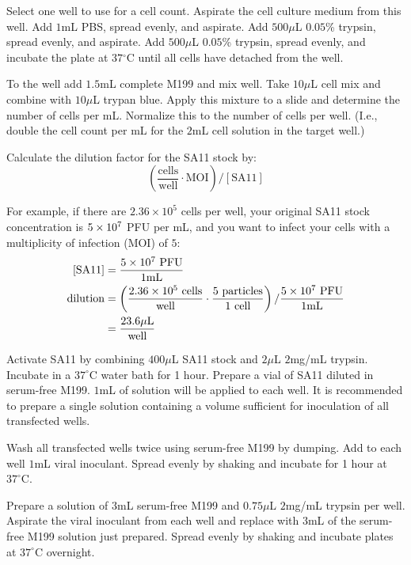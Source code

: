 Select one well to use for a cell count. Aspirate the cell culture medium from this well. Add $1$mL PBS, spread evenly, and aspirate. Add $500\mu$L $0.05$\% trypsin, spread evenly, and aspirate. Add $500\mu$L $0.05$\% trypsin, spread evenly, and incubate the plate at $37{^\circ}$C until all cells have detached from the well.

To the well add $1.5$mL complete M199 and mix well. Take $10\mu$L cell mix and combine with $10\mu$L trypan blue. Apply this mixture to a slide and determine the number of cells per mL. Normalize this to the number of cells per well. (I.e., double the cell count per mL for the $2$mL cell solution in the target well.)

Calculate the dilution factor for the SA11 stock by:
\begin{equation*}
\left(\frac{\text{cells}}{\text{well}}\cdot \text{MOI}\right)/\left[\text{SA11}\right]
\end{equation*}

For example, if there are $2.36\times 10^5$ cells per well, your original SA11 stock concentration is $5\times 10^{7}$ PFU per mL, and you want to infect your cells with a multiplicity of infection (MOI) of $5$:
\begin{align*}
\text{[SA11]} &= \frac{5\times 10^{7}\text{ PFU}}{1\text{mL}}\\
\text{dilution}&= \left(\frac{2.36\times 10^{5}\text{ cells}}{\text{well}}\cdot \frac{5\text{ particles}}{1\text{ cell}}\right)/\frac{5\times 10^{7}\text{ PFU}}{1\text{mL}}\\
&= \frac{23.6\mu\text{L}}{\text{well}}\\
\end{align*}

Activate SA11 by combining $400\mu$L SA11 stock and $2\mu$L $2$mg/mL trypsin. Incubate in a $37^{\circ}$C water bath for 1 hour. Prepare a vial of SA11 diluted in serum-free M199. $1$mL of solution will be applied to each well. It is recommended to prepare a single solution containing a volume sufficient for inoculation of all transfected wells.

Wash all transfected wells twice using serum-free M199 by dumping. Add to each well $1$mL viral inoculant. Spread evenly by shaking and incubate for 1 hour at $37^{\circ}$C.

Prepare a solution of $3$mL serum-free M199 and $0.75\mu$L $2$mg/mL trypsin per well. Aspirate the viral inoculant from each well and replace with $3$mL of the serum-free M199 solution just prepared. Spread evenly by shaking and incubate plates at $37^{\circ}$C overnight.

